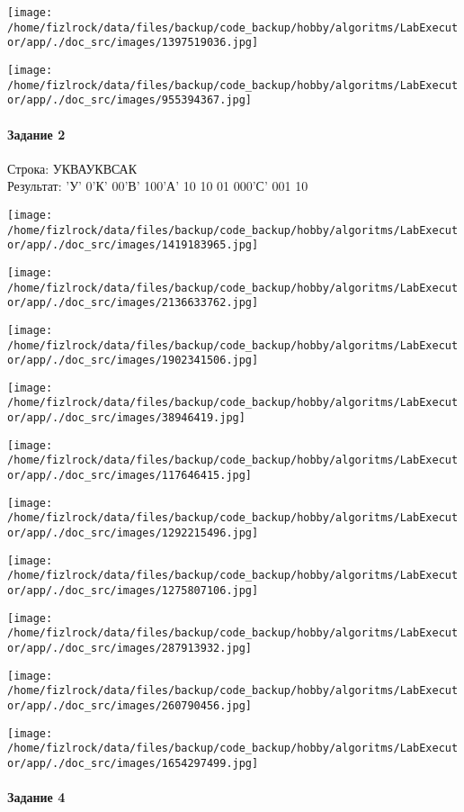 \documentclass[a4paper, 12pt]{article}
\begin{document}
\texttt{[image: /home/fizlrock/data/files/backup/code\_backup/hobby/algoritms/LabExecutor/app/./doc\_src/images/1397519036.jpg]}

\texttt{[image: /home/fizlrock/data/files/backup/code\_backup/hobby/algoritms/LabExecutor/app/./doc\_src/images/955394367.jpg]}
\pagebreak
\paragraph{Задание 2}

Строка: 
УКВАУКВСАК\\
Результат: 'У' 0'К' 00'В' 100'А' 10 10 01 000'С' 001 10

\texttt{[image: /home/fizlrock/data/files/backup/code\_backup/hobby/algoritms/LabExecutor/app/./doc\_src/images/1419183965.jpg]}

\texttt{[image: /home/fizlrock/data/files/backup/code\_backup/hobby/algoritms/LabExecutor/app/./doc\_src/images/2136633762.jpg]}

\texttt{[image: /home/fizlrock/data/files/backup/code\_backup/hobby/algoritms/LabExecutor/app/./doc\_src/images/1902341506.jpg]}

\texttt{[image: /home/fizlrock/data/files/backup/code\_backup/hobby/algoritms/LabExecutor/app/./doc\_src/images/38946419.jpg]}

\texttt{[image: /home/fizlrock/data/files/backup/code\_backup/hobby/algoritms/LabExecutor/app/./doc\_src/images/117646415.jpg]}

\texttt{[image: /home/fizlrock/data/files/backup/code\_backup/hobby/algoritms/LabExecutor/app/./doc\_src/images/1292215496.jpg]}

\texttt{[image: /home/fizlrock/data/files/backup/code\_backup/hobby/algoritms/LabExecutor/app/./doc\_src/images/1275807106.jpg]}

\texttt{[image: /home/fizlrock/data/files/backup/code\_backup/hobby/algoritms/LabExecutor/app/./doc\_src/images/287913932.jpg]}

\texttt{[image: /home/fizlrock/data/files/backup/code\_backup/hobby/algoritms/LabExecutor/app/./doc\_src/images/260790456.jpg]}

\texttt{[image: /home/fizlrock/data/files/backup/code\_backup/hobby/algoritms/LabExecutor/app/./doc\_src/images/1654297499.jpg]}
\pagebreak
\paragraph{Задание 4}
\end{document}
